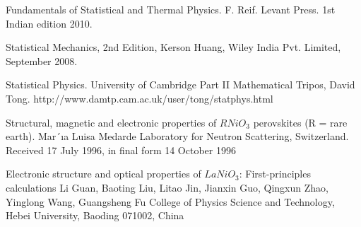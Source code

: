 \documentclass[24pt]{article}
\begin{document}
\begin{thebibliography}{9}

Fundamentals of Statistical and Thermal Physics. F. Reif. Levant Press. 1st Indian edition 2010.

Statistical Mechanics, 2nd Edition, Kerson Huang, Wiley India Pvt. Limited, September 2008.

Statistical Physics. 
University of Cambridge Part II Mathematical Tripos, 
David Tong.
http://www.damtp.cam.ac.uk/user/tong/statphys.html

Structural, magnetic and electronic properties of $RNiO_3$ perovskites (R = rare earth).
Mar´ıa Luisa Medarde
Laboratory for Neutron Scattering, Switzerland. 
Received 17 July 1996, in final form 14 October 1996

Electronic structure and optical properties of $LaNiO_3$: First-principles calculations
Li Guan, Baoting Liu, Litao Jin, Jianxin Guo, Qingxun Zhao, Yinglong Wang, Guangsheng Fu
College of Physics Science and Technology, Hebei University, Baoding 071002, China

\end{thebibliography}

\newpage
\end{document}
